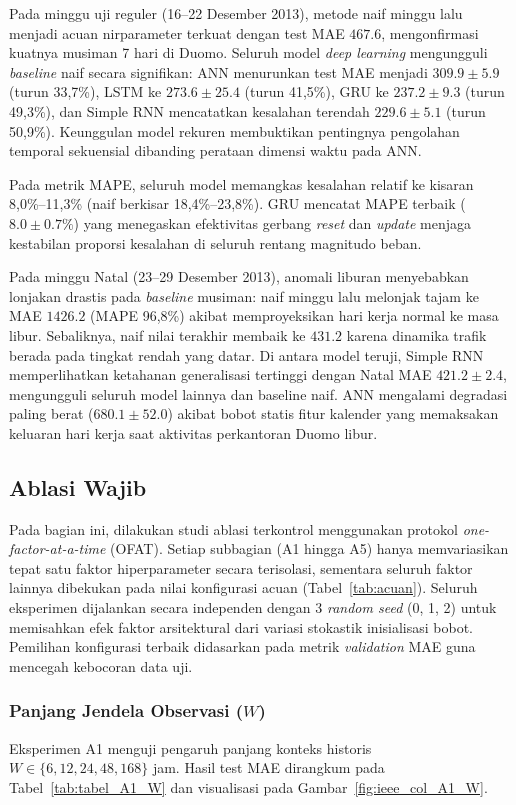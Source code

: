\documentclass[conference,a4paper]{IEEEtran}
\begin{document}
Pada minggu uji reguler (16--22 Desember 2013), metode naif minggu lalu menjadi acuan nirparameter terkuat dengan test MAE $467.6$, mengonfirmasi kuatnya musiman 7 hari di Duomo. Seluruh model \textit{deep learning} mengungguli \textit{baseline} naif secara signifikan: ANN menurunkan test MAE menjadi $309.9 \pm 5.9$ (turun 33,7\%), LSTM ke $273.6 \pm 25.4$ (turun 41,5\%), GRU ke $237.2 \pm 9.3$ (turun 49,3\%), dan Simple RNN mencatatkan kesalahan terendah $229.6 \pm 5.1$ (turun 50,9\%). Keunggulan model rekuren membuktikan pentingnya pengolahan temporal sekuensial dibanding perataan dimensi waktu pada ANN.

Pada metrik MAPE, seluruh model memangkas kesalahan relatif ke kisaran 8,0\%--11,3\% (naif berkisar 18,4\%--23,8\%). GRU mencatat MAPE terbaik ($8.0 \pm 0.7\%$) yang menegaskan efektivitas gerbang \textit{reset} dan \textit{update} menjaga kestabilan proporsi kesalahan di seluruh rentang magnitudo beban.

Pada minggu Natal (23--29 Desember 2013), anomali liburan menyebabkan lonjakan drastis pada \textit{baseline} musiman: naif minggu lalu melonjak tajam ke MAE $1426.2$ (MAPE 96,8\%) akibat memproyeksikan hari kerja normal ke masa libur. Sebaliknya, naif nilai terakhir membaik ke $431.2$ karena dinamika trafik berada pada tingkat rendah yang datar. Di antara model teruji, Simple RNN memperlihatkan ketahanan generalisasi tertinggi dengan Natal MAE $421.2 \pm 2.4$, mengungguli seluruh model lainnya dan baseline naif. ANN mengalami degradasi paling berat ($680.1 \pm 52.0$) akibat bobot statis fitur kalender yang memaksakan keluaran hari kerja saat aktivitas perkantoran Duomo libur.

\subsection{Ablasi Wajib}

Pada bagian ini, dilakukan studi ablasi terkontrol menggunakan protokol \textit{one-factor-at-a-time} (OFAT). Setiap subbagian (A1 hingga A5) hanya memvariasikan tepat satu faktor hiperparameter secara terisolasi, sementara seluruh faktor lainnya dibekukan pada nilai konfigurasi acuan (Tabel~\ref{tab:acuan}). Seluruh eksperimen dijalankan secara independen dengan 3 \textit{random seed} (0, 1, 2) untuk memisahkan efek faktor arsitektural dari variasi stokastik inisialisasi bobot. Pemilihan konfigurasi terbaik didasarkan pada metrik \textit{validation} MAE guna mencegah kebocoran data uji.

\subsubsection{Panjang Jendela Observasi ($W$)}
Eksperimen A1 menguji pengaruh panjang konteks historis $W \in \{6, 12, 24, 48, 168\}$ jam. Hasil test MAE dirangkum pada Tabel~\ref{tab:tabel_A1_W} dan visualisasi pada Gambar~\ref{fig:ieee_col_A1_W}.
\end{document}
